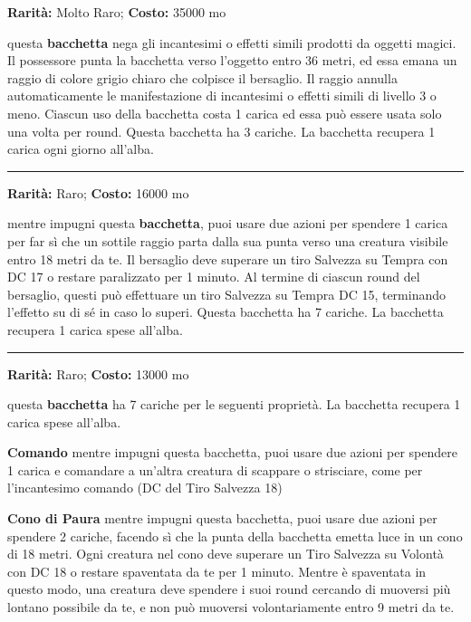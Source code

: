 \begin{multicols}{2}
\textbf{Rarità:} Molto Raro; \textbf{Costo:} 35000 mo

questa \textbf{bacchetta} nega gli incantesimi o effetti simili prodotti da oggetti magici. Il possessore punta la bacchetta verso l'oggetto entro 36 metri, ed essa emana un raggio di colore grigio chiaro che colpisce il bersaglio. Il raggio annulla automaticamente le manifestazione di incantesimi o effetti simili di livello 3 o meno. Ciascun uso della bacchetta costa 1 carica ed essa può essere usata solo una volta per round. Questa bacchetta ha 3 cariche. La bacchetta recupera 1 carica ogni giorno all'alba.

\smallskip\noindent\rule{\linewidth}{2pt}  \hypertarget{BacchettadellaParalisi}{}\medskip{}\noindent\label{BacchettadellaParalisi}

\textbf{Rarità:} Raro; \textbf{Costo:} 16000 mo

mentre impugni questa \textbf{bacchetta}, puoi usare due azioni per spendere 1 carica per far sì che un sottile raggio parta dalla sua punta verso una creatura visibile entro 18 metri da te. Il bersaglio deve superare un tiro Salvezza su Tempra con DC 17 o restare paralizzato per 1 minuto. Al termine di ciascun round del bersaglio, questi può effettuare un tiro Salvezza su Tempra DC 15, terminando l'effetto su di sé in caso lo superi. Questa bacchetta ha 7 cariche. La bacchetta recupera 1 carica spese all'alba.

\smallskip\noindent\rule{\linewidth}{2pt}  \hypertarget{BacchettadellaPaura}{}\medskip{}\noindent\label{BacchettadellaPaura}

\textbf{Rarità:} Raro; \textbf{Costo:} 13000 mo

questa \textbf{bacchetta} ha 7 cariche per le seguenti proprietà. La bacchetta recupera 1 carica spese all'alba.

\textbf{Comando} mentre impugni questa bacchetta, puoi usare due azioni per spendere 1 carica e comandare a un'altra creatura di scappare o strisciare, come per l'incantesimo comando (DC del Tiro Salvezza 18)

\textbf{Cono di Paura} mentre impugni questa bacchetta, puoi usare due azioni per spendere 2 cariche, facendo sì che la punta della bacchetta emetta luce in un cono di 18 metri. Ogni creatura nel cono deve superare un Tiro Salvezza su Volontà con DC 18 o restare spaventata da te per 1 minuto. Mentre è spaventata in questo modo, una creatura deve spendere i suoi round cercando di muoversi più lontano possibile da te, e non può muoversi volontariamente entro 9 metri da te.


\end{multicols}
